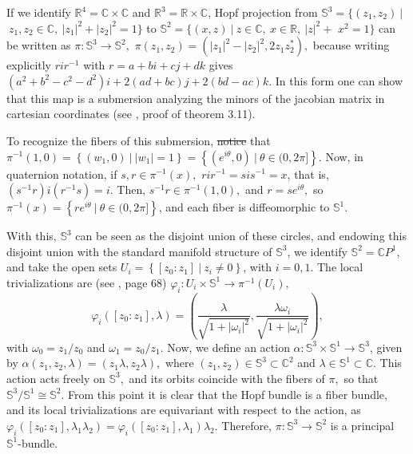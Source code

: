 \documentclass[12pt, letterpaper, reqno]{amsart}
\theoremstyle{definition}
\theoremstyle{plain}
\theoremstyle{remark}
\providecommand{\DIFadd}[1]{{\protect\color{blue}\uwave{#1}}} %
\providecommand{\DIFdel}[1]{{\protect\color{red}\sout{#1}}}                      %
\providecommand{\DIFaddbegin}{} %
\providecommand{\DIFaddend}{} %
\providecommand{\DIFdelbegin}{} %
\providecommand{\DIFdelend}{} %
\newcommand{\DIFscaledelfig}{0.5}
\newlength{\DIFdelgraphicswidth} %
\newlength{\DIFdelgraphicsheight} %
\newcommand{\DIFaddincludegraphics}[2][]{{\color{blue}\fbox{\DIFOincludegraphics[#1]{#2}}}} %
\newcommand{\DIFdelincludegraphics}[2][]{%
\sbox{\DIFdelgraphicsbox}{\DIFOincludegraphics[#1]{#2}}%
\settoboxwidth{\DIFdelgraphicswidth}{\DIFdelgraphicsbox} %
\settoboxtotalheight{\DIFdelgraphicsheight}{\DIFdelgraphicsbox} %
\scalebox{\DIFscaledelfig}{%
\parbox[b]{\DIFdelgraphicswidth}{\usebox{\DIFdelgraphicsbox}\\[-\baselineskip] \rule{\DIFdelgraphicswidth}{0em}}\llap{\resizebox{\DIFdelgraphicswidth}{\DIFdelgraphicsheight}{%
\setlength{\unitlength}{\DIFdelgraphicswidth}%
\begin{picture}(1,1)%
\thicklines\linethickness{2pt} %
{\color[rgb]{1,0,0}\put(0,0){\framebox(1,1){}}}%
{\color[rgb]{1,0,0}\put(0,0){\line( 1,1){1}}}%
{\color[rgb]{1,0,0}\put(0,1){\line(1,-1){1}}}%
\end{picture}%
}\hspace*{3pt}}} %
} %
\DeclareRobustCommand{\DIFaddbegin}{\DIFOaddbegin \let\includegraphics\DIFaddincludegraphics} %
\DeclareRobustCommand{\DIFaddend}{\DIFOaddend \let\includegraphics\DIFOincludegraphics} %
\DeclareRobustCommand{\DIFdelbegin}{\DIFOdelbegin \let\includegraphics\DIFdelincludegraphics} %
\DeclareRobustCommand{\DIFdelend}{\DIFOaddend \let\includegraphics\DIFOincludegraphics} %
\begin{document}
	If we identify $ \mathbb{R}^4=\mathbb{C}\times \mathbb{C} $ and $ \mathbb{R}^3= \mathbb{R}\times\mathbb{C}  $, Hopf projection from $ \mathbb{S}^3= \{ (z_1,z_2)\  |$ $ \ z_1,z_2\in \mathbb{C}, \ |z_1|^2+|z_2|^2=1 \} $ to $ \mathbb{S}^2 = \{ (x,z)\ | \ z\in \mathbb{C},\ x\in \mathbb{R},\ |z|^2+$ $x^2=1 \} $  can be written as $ \pi: \mathbb{S}^3 \rightarrow { \mathbb{S}^2},$ $ \pi(z_1,z_2) =(|z_1|^2-|z_2|^2, 2z_1z_2^* ),$ because writing explicitly $ rir^{-1} $ with $ r=a+bi+cj+dk $ gives $ (a^2+b^2-c^2-d^2)i+2(ad+bc)j+2(bd-ac)k. $    In this form one can show that this map is a submersion analyzing the minors of the jacobian matrix in cartesian coordinates (see \cite{linintroductory}, proof of theorem 3.11).

	To recognize the fibers of this submersion, \DIFdelbegin \DIFdel{notice }\DIFdelend \DIFaddbegin \DIFadd{note }\DIFaddend that $ \pi^{-1}(1,0) = \left\{ (w_1,0) \ | \ |w_1| =1 \right\} = \left\{ (e^{i\theta},0) \ | \ \theta\in (0,2\pi]  \right\} $. Now, in quaternion notation, if $ s,r\in \pi^{-1}(x), $ $ rir^{-1} = sis^{-1}=x $, that is, $ (s^{-1}r)i(r^{-1}s) = i $. Then, $ s^{-1}r \in \pi^{-1}(1,0), $ and $ r= se^{i\theta}, $ so $ \pi^{-1}(x) = \left\{ re^{i\theta}\ | \ \theta\in (0,2\pi] \right\} $, and each fiber is diffeomorphic to $ \mathbb{S}^1. $        

	With this, $ \mathbb{S}^3 $ can be seen as the disjoint union of these circles, and endowing this disjoint union with the standard manifold structure of $ \mathbb{S}^3 $, we identify $ \mathbb{S}^2 = \mathbb{C}P^1$, and take the open sets $ U_i= \left\{ \left[ z_0 : z_1 \right]\ | \ z_i\neq 0 \right\}$, with $ i=0,1. $ The local trivializations are (see \cite{luke2013vector}, page 68) $ \varphi_i: U_i \times \mathbb{S}^1 \rightarrow \pi^{-1}(U_i), $ $$ \varphi_i([z_0:z_1], \lambda) = \left( \frac{\lambda}{\sqrt{1+|\omega_i|^2}}, \frac{\lambda\omega_i}{\sqrt{1+|\omega_i|^2}}   \right), $$ with $ \omega_0=z_1/z_0 $ and $ \omega_1 = z_0/z_1. $ Now, we define an action $ \alpha: \mathbb{S}^3\times \mathbb{S}^1 \rightarrow { \mathbb{S}^3}
	$, given by $ \alpha(z_1,z_2,\lambda) = (z_1\lambda, z_2\lambda), $ where $ (z_1,z_2)\in \mathbb{S}^3\subset \mathbb{C}^2 $ and $ \lambda\in \mathbb{S}^1 \subset \mathbb{C}. $ This action acts freely on $ \mathbb{S}^3, $ and its orbits coincide with the fibers of $ \pi, $ so that $ \mathbb{S}^3/ \mathbb{S}^1 \cong \mathbb{S}^2. $ From this point it is clear that the Hopf bundle is a fiber bundle, and its local trivializations are equivariant with respect to the action, as $ \varphi_i([z_0:z_1], \lambda_1\lambda_2) = \varphi_i([z_0:z_1], \lambda_1)\lambda_2. $ Therefore, $ \pi: \mathbb{S}^3 \rightarrow { \mathbb{S}^2} $ is a principal $ \mathbb{S}^1$-bundle.
\end{document}
